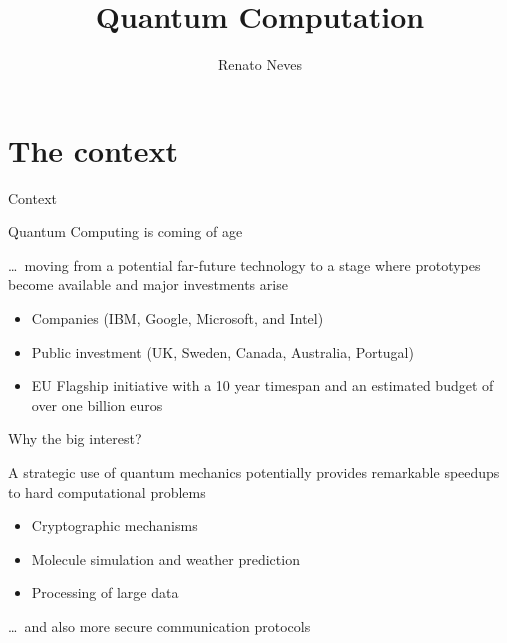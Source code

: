 \documentclass{beamer}
\author[Renato Neves]{Renato Neves}
\date{}
\begin{document}
\title{Quantum Computation}

\frame[plain]{\titlepage}

\section{The context}

\begin{frame}{Context}

  Quantum Computing is coming of age

  \dots\ moving from a potential far-future technology
  to a stage where prototypes become available and
  \alert{major investments} arise
  \begin{itemize}
  \item Companies (IBM, Google, Microsoft, and Intel)
  \item Public investment (UK, Sweden, Canada, Australia, Portugal)
  \item EU Flagship initiative with a 10 year timespan and an
  estimated budget of over one billion euros
  \end{itemize}
\end{frame}

\begin{frame}{Why the big interest?}
        
  A strategic use of quantum mechanics potentially provides remarkable speedups
  to hard \alert{computational} problems

  \begin{itemize}
  \item Cryptographic mechanisms
  \item Molecule simulation and weather prediction
  \item Processing of large data
  \end{itemize}

  \dots\ and also more secure \alert{communication protocols}
\end{frame}
\end{document}
